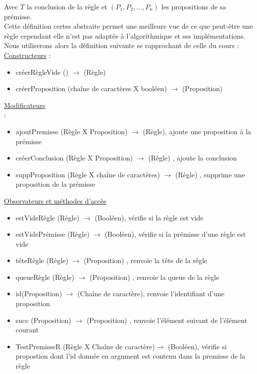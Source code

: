 \documentclass{article}
\begin{document}
Avec $T$ la conclusion de la règle et $(P_1,P_2,...,P_n)$ les propositions de sa prémisse.\\


Cette définition certes abstraite permet une meilleure vue de ce que peut-être une règle cependant elle n'est pas adaptée à l'algorithmique et ses implémentations.\\\clearpage
Nous utiliserons alors la définition suivante se rapprochant de celle du cours : \\

\underline{Constructeurs} : 

\begin{itemize}
    \item créerRègleVide () $\longrightarrow$ (Règle)
    \item créerProposition (chaîne de caractères X booléen) $\longrightarrow$ (Proposition)
\end{itemize}

\underline{Modificateurs\\} : 

\begin{itemize}
    \item ajoutPremisse (Règle X Proposition) $\longrightarrow$ (Règle), ajoute une proposition à la prémisse
    \item créerConclusion (Règle X Proposition) $\longrightarrow$ (Règle) , ajoute la conclusion
    \item suppProposition (Règle X chaîne de caractères) $\longrightarrow$ (Règle) , supprime une proposition de la prémisse\\
\end{itemize}
\underline{Observateurs et méthodes d'accès}
\begin{itemize}
    \item estVideRègle (Règle) $\longrightarrow$ (Booléen), vérifie si la règle est vide
    \item estVidePrémisse (Règle) $\longrightarrow$ (Booléen), vérifie si la prémisse d'une règle est vide
    \item têteRègle (Règle) $\longrightarrow$ (Proposition) , renvoie la tête de la règle
    \item queueRègle (Règle) $\longrightarrow$ (Proposition) , renvoie la queue de la règle
    \item id(Proposition) $\longrightarrow$ (Chaîne de caractère), renvoie l'identifiant d'une proposition
    \item succ (Proposition) $\longrightarrow$ (Proposition) , renvoie l'élément suivant de l'élément courant
    \item TestPremisseR (Règle X Chaîne de caractère)$\longrightarrow$ (Booléen), vérifie si propostion dont l'id donnée en argument est contenu dans la premisse de la règle 
\end{itemize}
\end{document}
